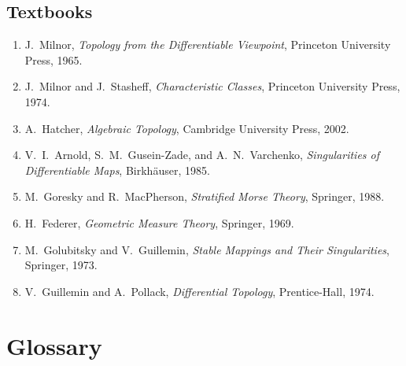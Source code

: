 \subsection*{Textbooks}
\begin{enumerate}
    \item J.\ Milnor, \textit{Topology from the Differentiable Viewpoint}, Princeton University Press, 1965.
    \item J.\ Milnor and J.\ Stasheff, \textit{Characteristic Classes}, Princeton University Press, 1974.
    \item A.\ Hatcher, \textit{Algebraic Topology}, Cambridge University Press, 2002.
    \item V.\ I.\ Arnold, S.\ M.\ Gusein-Zade, and A.\ N.\ Varchenko, \textit{Singularities of Differentiable Maps}, Birkh\"{a}user, 1985.
    \item M.\ Goresky and R.\ MacPherson, \textit{Stratified Morse Theory}, Springer, 1988.
    \item H.\ Federer, \textit{Geometric Measure Theory}, Springer, 1969.
    \item M.\ Golubitsky and V.\ Guillemin, \textit{Stable Mappings and Their Singularities}, Springer, 1973.
    \item V.\ Guillemin and A.\ Pollack, \textit{Differential Topology}, Prentice-Hall, 1974.
\end{enumerate}

\section*{Glossary}

